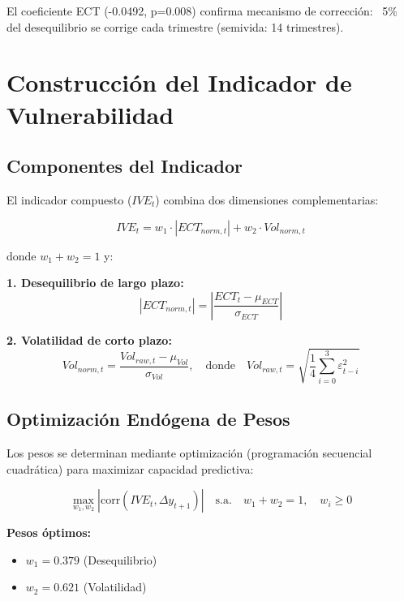 \documentclass[3p,11pt]{elsarticle}
\begin{document}
El coeficiente ECT (-0.0492, p=0.008) confirma mecanismo de corrección: ~5\% del desequilibrio se corrige cada trimestre (semivida: 14 trimestres).

\section{Construcción del Indicador de Vulnerabilidad}

\subsection{Componentes del Indicador}

El indicador compuesto ($IVE_t$) combina dos dimensiones complementarias:

\begin{equation}
IVE_t = w_1 \cdot |ECT_{norm,t}| + w_2 \cdot Vol_{norm,t}
\end{equation}

donde $w_1 + w_2 = 1$ y:

\textbf{1. Desequilibrio de largo plazo:}
\begin{equation}
|ECT_{norm,t}| = \left|\frac{ECT_t - \mu_{ECT}}{\sigma_{ECT}}\right|
\end{equation}

\textbf{2. Volatilidad de corto plazo:}
\begin{equation}
Vol_{norm,t} = \frac{Vol_{raw,t} - \mu_{Vol}}{\sigma_{Vol}}, \quad \text{donde} \quad Vol_{raw,t} = \sqrt{\frac{1}{4} \sum_{i=0}^{3} \varepsilon_{t-i}^2}
\end{equation}

\subsection{Optimización Endógena de Pesos}

Los pesos se determinan mediante optimización (programación secuencial cuadrática) para maximizar capacidad predictiva:

\begin{equation}
\max_{w_1,w_2} |\text{corr}(IVE_t, \Delta y_{t+1})| \quad \text{s.a.} \quad w_1 + w_2 = 1, \quad w_i \geq 0
\end{equation}

\textbf{Pesos óptimos:}
\begin{itemize}
    \item $w_1 = 0.379$ (Desequilibrio)
    \item $w_2 = 0.621$ (Volatilidad)
\end{itemize}
\end{document}
